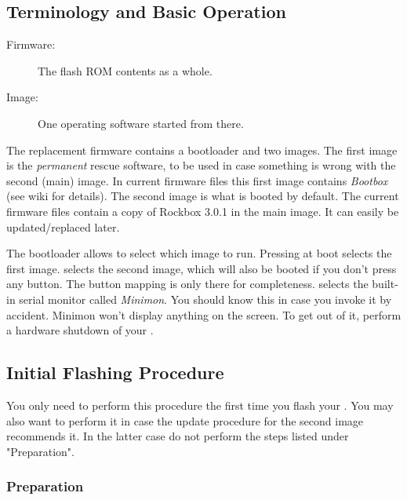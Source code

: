 \subsection{Terminology and Basic Operation}

\begin{description}
\item[Firmware:] The flash ROM contents as a whole.
\item[Image:] One operating software started from there.
\end{description}

The replacement firmware contains a bootloader and two images. The first image
is the \emph{permanent} rescue software, to be used in case something is wrong
with the second (main) image. In current firmware files this first image
contains \emph{Bootbox} (see wiki for details). The second image is what is
booted by default. The current firmware files contain a copy of Rockbox 3.0.1
in the main image. It can easily be updated/replaced later.

The bootloader allows to select which image to run. Pressing
 at boot
selects the first image.
selects the second image, which will also be booted if you don't press any
button. The button mapping is only there for completeness.
selects the built-in serial monitor called \emph{Minimon}. You should know this
in case you invoke it by accident. Minimon won't display anything on the
screen. To get out of it, perform a hardware shutdown of your \dap.

\subsection{Initial Flashing Procedure}

You only need to perform this procedure the first time you flash your
\playertype. You may also want to perform it in case the update procedure for
the second image recommends it. In the latter case do not perform the steps
listed under "Preparation".

\subsubsection{Preparation}


